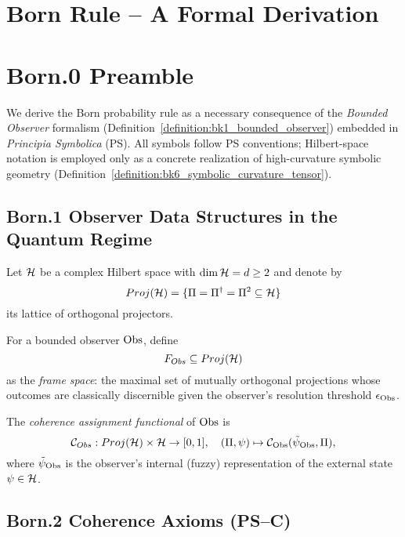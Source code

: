 \section{Born Rule – A Formal Derivation}
\label{sec:appC_born_rule}

\section*{Born.0 Preamble}
\label{sec:appC_born_preamble}
We derive the Born probability rule as a necessary consequence of the
\emph{Bounded Observer} formalism (Definition~\ref{definition:bk1_bounded_observer})
embedded in \textit{Principia Symbolica} (PS).
All symbols follow PS conventions; Hilbert-space notation is employed
only as a concrete realization of high-curvature symbolic geometry
(Definition~\ref{definition:bk6_symbolic_curvature_tensor}).

\subsection{Born.1 Observer Data Structures in the Quantum Regime}
\label{subsec:appC_born_observer_structures}
Let $\mathcal{H}$ be a complex Hilbert space with $\dim\mathcal{H} = d \ge 2$
and denote by
\[
Proj(\mathcal{H}) = \{\Pi = \Pi^\dagger = \Pi^2 \subseteq \mathcal{H}\}
\]
its lattice of orthogonal projectors.

\begin{definition}
\label{definition:appC_frame_space}
For a bounded observer $\mathrm{Obs}$, define
\[
F_{Obs} \subseteq Proj(\mathcal{H})
\]
as the \emph{frame space}: the maximal set of mutually orthogonal projections
whose outcomes are classically discernible given the observer’s resolution threshold
$\epsilon_{\mathrm{Obs}}$.
\end{definition}

\begin{definition}
\label{definition:appC_coherence_functional}
The \emph{coherence assignment functional} of $\mathrm{Obs}$ is
\[
\mathcal{C}_{Obs}: Proj(\mathcal{H}) \times \mathcal{H} \to [0,1], \quad
(\Pi, \psi) \mapsto \mathcal{C}_{\mathrm{Obs}}(\tilde\psi_{\mathrm{Obs}}, \Pi),
\]
where $\tilde\psi_{\mathrm{Obs}}$ is the observer’s internal (fuzzy) representation
of the external state $\psi \in \mathcal{H}$.
\end{definition}

\subsection{Born.2 Coherence Axioms (PS–C)}
\label{subsec:appC_born_axioms}

